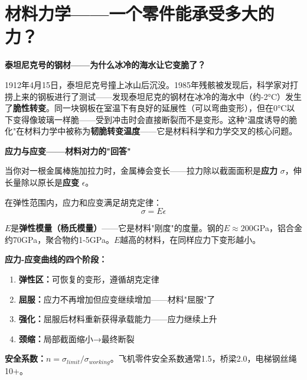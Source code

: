 \documentclass[a4paper,11pt]{ctexbook}
\newenvironment{scenario}{
  \vspace{0.4cm}
  \noindent\begin{tcolorbox}[colback=scenario!5!white,colframe=scenario!70!black,title=\textcolor{scenario}{\textbf{情景引入}}]
  \vspace{0.1cm}
}{\end{tcolorbox}\vspace{0.3cm}}
\newenvironment{qualitative}{
  \vspace{0.3cm}
  \noindent\begin{tcolorbox}[colback=themeblue!5!white,colframe=themeblue!60!black,title=\textcolor{themeblue}{\textbf{定性分析}}]
  \vspace{0.1cm}
}{\end{tcolorbox}\vspace{0.3cm}}
\begin{document}
\newpage
\chapter{材料力学——一个零件能承受多大的力？}

\begin{scenario}
\textbf{泰坦尼克号的钢材——为什么冰冷的海水让它变脆了？}

1912年4月15日，泰坦尼克号撞上冰山后沉没。1985年残骸被发现后，科学家对打捞上来的钢板进行了测试——发现泰坦尼克的钢材在冰冷的海水中（约-2°C）发生了\textbf{脆性转变}。同一块钢板在室温下有良好的延展性（可以弯曲变形），但在0°C以下变得像玻璃一样脆——受到冲击时会直接断裂而不是变形。这种"温度诱导的脆化"在材料力学中被称为\textbf{韧脆转变温度}——它是材料科学和力学交叉的核心问题。
\end{scenario}

\begin{qualitative}
\textbf{应力与应变——材料对力的"回答"}

当你对一根金属棒施加拉力时，金属棒会变长——拉力除以截面面积是\textbf{应力} $\sigma$，伸长量除以原长是\textbf{应变} $\epsilon$。

在弹性范围内，应力和应变满足胡克定律：
\[
\sigma = E\epsilon
\]

$E$是\textbf{弹性模量（杨氏模量）}——它是材料"刚度"的度量。钢的$E\approx 200$GPa，铝合金约70GPa，聚合物约1-5GPa。$E$越高的材料，在同样应力下变形越小。

\textbf{应力-应变曲线的四个阶段：}
\begin{enumerate}
  \item \textbf{弹性区：}可恢复的变形，遵循胡克定律
  \item \textbf{屈服：}应力不再增加但应变继续增加——材料"屈服"了
  \item \textbf{强化：}屈服后材料重新获得承载能力——应力继续上升
  \item \textbf{颈缩：}局部截面缩小→最终断裂
\end{enumerate}

\textbf{安全系数：}$n = \sigma_{limit} / \sigma_{working}$。飞机零件安全系数通常1.5，桥梁2.0，电梯钢丝绳10+。
\end{qualitative}
\end{document}
